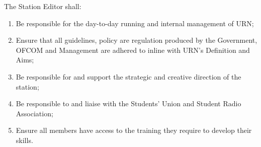 \item The Station Editor shall:
\begin{enumerate}[label*=\arabic*.]
    \item Be responsible for the day-to-day running and internal management of URN;
    \item Ensure that all guidelines, policy are regulation produced by the Government, OFCOM and Management are adhered to inline with URN's Definition and Aims;
    \item Be responsible for and support the strategic and creative direction of the station;
    \item Be responsible to and liaise with the Students' Union and Student Radio Association;
    \item Ensure all members have access to the training they require to develop their skills.
\end{enumerate}
